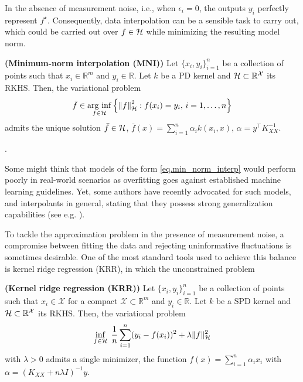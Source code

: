 In the absence of measurement noise, i.e., when $\epsilon_i = 0$, the outputs $y_i$ perfectly represent $f^\star$. Consequently, data interpolation can be a sensible task to carry out, which could be carried out over $f \in \mathcal{H}$ while minimizing the resulting model norm.
\begin{proposition}
	\textbf{(Minimum-norm interpolation (MNI))}
	Let $\{x_i,y_i\}_{i=1}^n$ be a collection of points such that $x_i \in \mathbb{R}^m$ and $y_i \in \mathbb{R}$. Let $k$ be a PD kernel and $\mathcal{H} \subset \mathbb{R}^\mathcal{X}$ its RKHS. Then, the variational problem
	\begin{equation}
		\label{eq.min_norm_interp}
			\bar{f} \in \operatorname*{\arg\,\inf}_{f \in \mathcal{H}} \left\{ \left\| f \right\|_\mathcal{H}^2 : f(x_i) = y_i, \, i = 1,\dots,n \right\}
	\end{equation}
	admits the unique solution $\bar f \in \mathcal{H}$, $\bar f(x) =  \sum_{i=1}^n \alpha_i k(x_i,x)$, $\alpha = y^\top K_{XX}^{-1}$.
\end{proposition}
\begin{my_proof}
	\cite[Theorem~3.5]{kanagawa2018gaussian}.
\end{my_proof}

Some might think that models of the form \eqref{eq.min_norm_interp} would perform poorly in real-world scenarios as overfitting goes against established machine learning guidelines. Yet, some authors have recently advocated for such models, and interpolants in general, stating that they possess strong generalization capabilities (see e.g. \cite{belkin2018understand,belkin2019reconciling,beaglehole2022kernel}).

To tackle the approximation problem in the presence of measurement noise, a compromise between fitting the data and rejecting uninformative fluctuations is sometimes desirable. One of the most standard tools used to achieve this balance is kernel ridge regression (KRR), in which the unconstrained problem

\begin{proposition}
	\textbf{(Kernel ridge regression (KRR))}
	Let $\{x_i,y_i\}_{i=1}^n$ be a collection of points such that $x_i \in \mathcal{X}$ for a compact $\mathcal{X} \subset \mathbb{R}^m$ and $y_i \in \mathbb{R}$. Let $k$ be a SPD kernel and $\mathcal{H} \subset \mathbb{R}^\mathcal{X}$ its RKHS. Then, the variational problem
	\begin{equation}
		\inf_{f\in \mathcal{H}} \; \frac{1}{n} \sum_{i=1}^n (y_i - f(x_i))^2 + \lambda \Vert f \Vert_{\mathcal{H}}^2
	\end{equation}
	with $\lambda > 0$ admits a single minimizer, the function $f(x) = \sum_{i=1}^n \alpha_i x_i$ with $\alpha = (K_{XX} + n \lambda I)^{-1} y$. 
\end{proposition}


